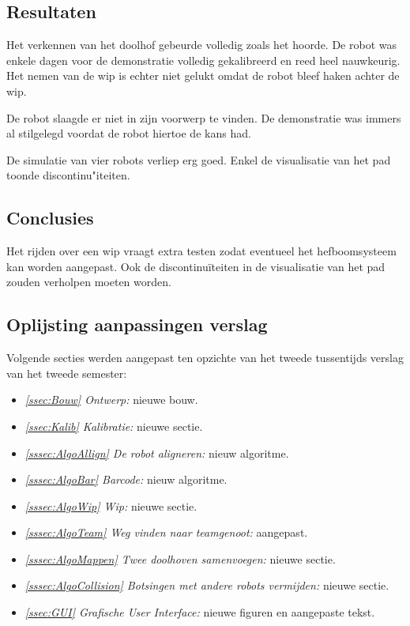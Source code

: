 \documentclass[eind]{penoverslag}
\begin{document}
\subsection{Resultaten}
\label{Assec:result2}
Het verkennen van het doolhof gebeurde volledig zoals het hoorde. De robot was enkele dagen voor de demonstratie volledig gekalibreerd en reed heel nauwkeurig. Het nemen van de wip is echter niet gelukt omdat de robot bleef haken achter de wip.

De robot slaagde er niet in zijn voorwerp te vinden. De demonstratie was immers al stilgelegd voordat de robot hiertoe de kans had.

De simulatie van vier robots verliep erg goed. Enkel de visualisatie van het pad toonde discontinu"iteiten.

\subsection{Conclusies}
\label{Assec:conc2}
Het rijden over een wip vraagt extra testen zodat eventueel het hefboomsysteem kan worden aangepast. Ook de discontinu\"iteiten in de visualisatie van het pad zouden verholpen moeten worden.

\subsection{Oplijsting aanpassingen verslag}
\label{Assec:aanp2}
Volgende secties werden aangepast ten opzichte van het tweede tussentijds verslag van het tweede semester:

\begin{itemize}
\item \textit{\ref{ssec:Bouw} Ontwerp:} nieuwe bouw.
\item \textit{\ref{ssec:Kalib} Kalibratie:} nieuwe sectie.
\item \textit{\ref{sssec:AlgoAllign} De robot aligneren:} nieuw algoritme.
\item \textit{\ref{sssec:AlgoBar} Barcode:} nieuw algoritme.
\item \textit{\ref{sssec:AlgoWip} Wip:} nieuwe sectie.
\item \textit{\ref{sssec:AlgoTeam} Weg vinden naar teamgenoot:} aangepast.
\item \textit{\ref{sssec:AlgoMappen} Twee doolhoven samenvoegen:} nieuwe sectie.
\item \textit{\ref{sssec:AlgoCollision} Botsingen met andere robots vermijden:} nieuwe sectie.
\item \textit{\ref{ssec:GUI} Grafische User Interface:} nieuwe figuren en aangepaste tekst.
\end{itemize}
\end{document}
